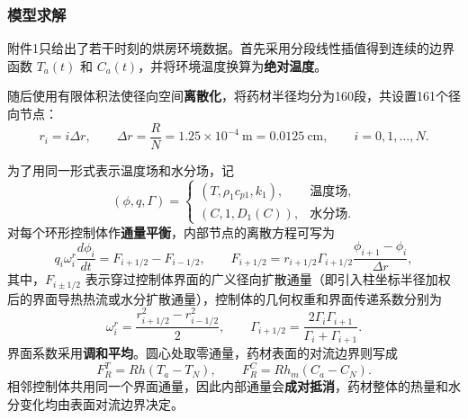 \documentclass[12pt,a4paper,fontset=none]{ctexart}
\begin{document}
\subsubsection{模型求解}
附件1只给出了若干时刻的烘房环境数据。首先采用分段线性插值得到连续的边界函数 $T_a(t)$ 和 $C_a(t)$，并将环境温度换算为\textbf{绝对温度}。

随后使用有限体积法使径向空间\textbf{离散化}，将药材半径均分为160段，共设置161个径向节点：
\begin{equation}
r_i=i\Delta r,\qquad \Delta r=\frac{R}{N}=1.25\times10^{-4}\ \mathrm m
=0.0125\ \mathrm{cm},\qquad i=0,1,\ldots,N.
\end{equation}

为了用同一形式表示温度场和水分场，记
\begin{equation}
(\phi,q,\Gamma)=
\begin{cases}
(T,\rho_1c_{p1},k_1), & \text{温度场},\\
(C,1,D_1(C)), & \text{水分场}.
\end{cases}
\end{equation}
对每个环形控制体作\textbf{通量平衡}，内部节点的离散方程可写为
\begin{equation}
q_i\omega_i^r\frac{d\phi_i}{dt}=F_{i+1/2}-F_{i-1/2},\qquad
F_{i+1/2}=r_{i+1/2}\Gamma_{i+1/2}
\frac{\phi_{i+1}-\phi_i}{\Delta r},\label{eq:fvm-r}
\end{equation}
其中，$F_{i\pm1/2}$ 表示穿过控制体界面的广义径向扩散通量（即引入柱坐标半径加权后的界面导热热流或水分扩散通量），控制体的几何权重和界面传递系数分别为
\begin{equation}
\omega_i^r=\frac{r_{i+1/2}^2-r_{i-1/2}^2}{2},\qquad
\Gamma_{i+1/2}=\frac{2\Gamma_i\Gamma_{i+1}}{\Gamma_i+\Gamma_{i+1}}.
\end{equation}
界面系数采用\textbf{调和平均}\cite{patankar}。圆心处取零通量，药材表面的对流边界则写成
\begin{equation}
F_R^T=Rh(T_a-T_N),\qquad F_R^C=Rh_m(C_a-C_N).
\end{equation}
相邻控制体共用同一个界面通量，因此内部通量会\textbf{成对抵消}，药材整体的热量和水分变化均由表面对流边界决定。
\end{document}

